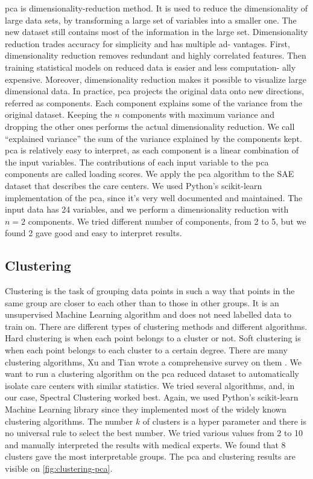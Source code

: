 \ac{pca} is dimensionality-reduction method. It is used to reduce the
dimensionality of large data sets, by transforming a large set of variables into
a smaller one. The new dataset still contains most of the information in the
large set. Dimensionality reduction trades accuracy for simplicity and has
multiple ad- vantages. First, dimensionality reduction removes redundant and
highly correlated features. Then training statistical models on reduced data is
easier and less computation- ally expensive. Moreover, dimensionality reduction
makes it possible to visualize large dimensional data. In practice, \ac{pca}
projects the original data onto new directions, referred as components. Each
component explains some of the variance from the original dataset. Keeping the
$n$ components with maximum variance and dropping the other ones performs the
actual dimensionality reduction. We call ``explained variance'' the sum of the
variance explained by the components kept. \ac{pca} is relatively easy to
interpret, as each component is a linear combination of the input variables. The
contributions of each input variable to the \ac{pca} components are called
loading scores. We apply the \ac{pca} algorithm to the SAE dataset that
describes the care centers. We used Python's scikit-learn
\cite{pedregosa_scikit-learn_2011} implementation of the \ac{pca}, since it's
very well documented and maintained. The input data has 24 variables, and we
perform a dimensionality reduction with $n=2$ components. We tried different
number of components, from 2 to 5, but we found 2 gave good and easy to
interpret results.

\subsection{Clustering}

Clustering is the task of grouping data points in such a way that points in the
same group are closer to each other than to those in other groups. It is an
unsupervised Machine Learning algorithm and does not need labelled data to train
on. There are different types of clustering methods and different algorithms.
Hard clustering is when each point belongs to a cluster or not. Soft clustering
is when each point belongs to each cluster to a certain degree. There are many
clustering algorithms, Xu and Tian wrote a comprehensive survey on them
\cite{xu_comprehensive_2015}. We want to run a clustering algorithm on the
\ac{pca} reduced dataset to automatically isolate care centers with similar
statistics. We tried several algorithms, and, in our case, Spectral Clustering
\cite{luxburg_tutorial_2007} worked best. Again, we used Python's scikit-learn
Machine Learning library \cite{pedregosa_scikit-learn_2011} since they
implemented most of the widely known clustering algorithms. The number $k$ of
clusters is a hyper parameter and there is no universal rule to select the best
number. We tried various values from 2 to 10 and manually interpreted the
results with medical experts. We found that 8 clusters gave the most
interpretable groups. The \ac{pca} and clustering results are visible on
\cref{fig:clustering-pca}.

